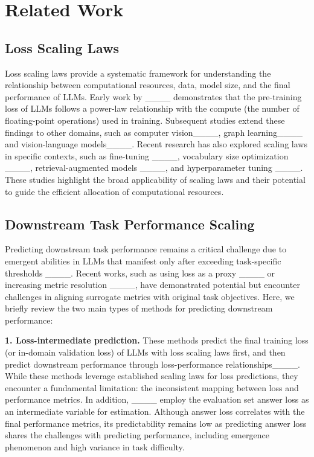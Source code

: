 \section{Related Work}
\label{sec:relatedwork}

\subsection{Loss Scaling Laws}
Loss scaling laws provide a systematic framework for understanding the relationship between computational resources, data, model size, and the final performance of LLMs. Early work by ____ demonstrates that the pre-training loss of LLMs follows a power-law relationship with the compute (the number of floating-point operations) used in training. Subsequent studies extend these findings to other domains, such as computer vision____, graph learning____ and vision-language models____. Recent research has also explored scaling laws in specific contexts, such as fine-tuning ____, vocabulary size optimization ____, retrieval-augmented models ____, and hyperparameter tuning ____. These studies highlight the broad applicability of scaling laws and their potential to guide the efficient allocation of computational resources.


\subsection{Downstream Task Performance Scaling}

Predicting downstream task performance remains a critical challenge due to emergent abilities in LLMs that manifest only after exceeding task-specific thresholds ____. 
Recent works, such as using loss as a proxy ____ or increasing metric resolution ____, have demonstrated potential but encounter challenges in aligning surrogate metrics with original task objectives. Here, we briefly review the two main types of methods for predicting downstream performance:

\noindent\textbf{1. Loss-intermediate prediction.}
These methods predict the final training loss (or in-domain validation loss) of LLMs with loss scaling laws first, and then predict downstream performance through loss-performance relationships____. While these methods leverage established scaling laws for loss predictions, they encounter a fundamental limitation: the inconsistent mapping between loss and performance metrics. In addition, ____ employ the evaluation set answer loss as an intermediate variable for estimation. Although answer loss correlates with the final performance metrics, its predictability remains low as predicting answer loss shares the challenges with predicting performance, including emergence phenomenon and high variance in task difficulty.


